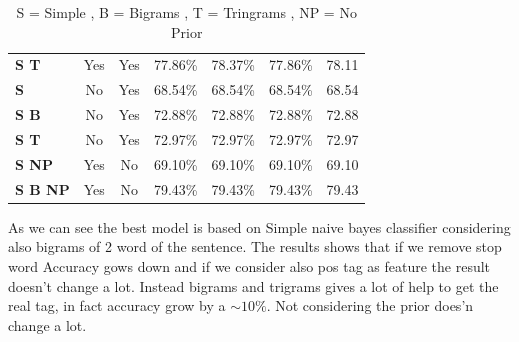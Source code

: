 \documentclass[a4paper,8pt,oneside]{article}
\begin{document}
\begin{table}[h]
\begin{tabular}{lcccccc}
			\textbf{S T} & Yes                & Yes              & 77.86\%           & 78.37\%            & 77.86\%         & 78.11             \\
			\textbf{S}               & No                 & Yes              & 68.54\%           & 68.54\%            & 68.54\%         & 68.54             \\
			\textbf{S B}  & No                 & Yes              & 72.88\%           & 72.88\%            & 72.88\%         & 72.88             \\
			\textbf{S T} & No                 & Yes              & 72.97\%           & 72.97\%            & 72.97\%         & 72.97 \\
			\textbf{S NP} & 	Yes & 	No              & 69.10\%           & 69.10\%            & 69.10\%         & 69.10  \\
			\textbf{S B NP} & Yes  & No              & 79.43\%           & 79.43\%            & 79.43\%         & 79.43             
			\end{tabular}
			\caption{ S = Simple , B = Bigrams , T = Tringrams , NP = No Prior }
			\label{bayes}
			\end{table}
			As we can see the best model is based on Simple naive bayes classifier considering also bigrams of 2 word of the sentence. The results shows that if we remove stop word Accuracy gows down and if we consider also pos tag as feature the result doesn't change a lot. Instead bigrams and trigrams gives a lot of help to get the real tag, in fact accuracy grow by a $\sim 10\% $. Not considering the prior does'n change a lot.
\end{document}
